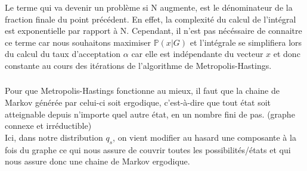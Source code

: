 \subsubsection{}
\paragraph*{}
Le terme qui va devenir un problème si N augmente, est le dénominateur de la fraction finale du point précédent. En effet, la complexité du calcul de l'intégral
est exponentielle par rapport à N. Cependant, il n'est pas nécéssaire de connaitre ce terme car nous souhaitons maximiser $\mathbb{P}(x|G)$ et l'intégrale se 
simplifiera lors du calcul du taux d'acceptation $\alpha$ car elle est indépendante du vecteur $x$ et donc constante au cours des itérations de l'algorithme de 
Metropolis-Hastings.
\subsubsection{}
Pour que Metropolis-Hastings fonctionne au mieux, il faut que la chaine de Markov générée par celui-ci soit ergodique, c'est-à-dire que tout état soit atteignable depuis n'importe quel autre état,
en un nombre fini de pas. (graphe connexe et irréductible) \\
Ici, dans notre distribution $q_{s}$, on vient modifier au hasard une composante à la fois du graphe ce qui nous assure de couvrir toutes les possibilités/états et qui nous assure donc une chaine de Markov ergodique.
